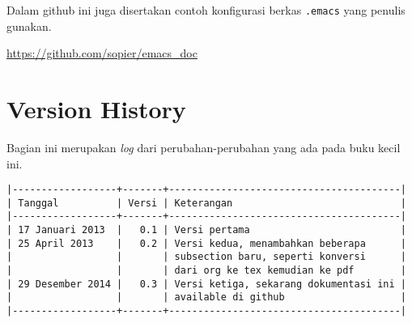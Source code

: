 \documentclass{article}
\begin{document}
Dalam github ini juga disertakan contoh konfigurasi berkas
\texttt{.emacs} yang penulis gunakan.

\url{https://github.com/sopier/emacs\_doc}

\section{Version History}
Bagian ini merupakan \emph{log} dari perubahan-perubahan yang ada pada buku
kecil ini.

\begin{verbatim}
|------------------+-------+----------------------------------------|
| Tanggal          | Versi | Keterangan                             |
|------------------+-------+----------------------------------------|
| 17 Januari 2013  |   0.1 | Versi pertama                          |
| 25 April 2013    |   0.2 | Versi kedua, menambahkan beberapa      |
|                  |       | subsection baru, seperti konversi      |
|                  |       | dari org ke tex kemudian ke pdf        |
| 29 Desember 2014 |   0.3 | Versi ketiga, sekarang dokumentasi ini |
|                  |       | available di github                    |
|------------------+-------+----------------------------------------|
\end{verbatim}
\end{document}
